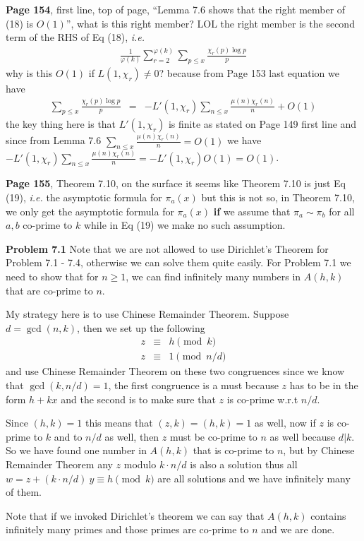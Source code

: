 \documentclass[aps,preprint,preprintnumbers,nofootinbib,showpacs,prd]{revtex4-1}
\newcommand{\ie}{{\it i.e.} }
\newcommand{\nbea}{\begin{eqnarray*}}
\newcommand{\neea}{\end{eqnarray*}}
\begin{document}
{\bf Page 154}, first line, top of page, ``Lemma 7.6 shows that the right member of (18) is $O(1)$'', what is this right member? LOL the right member is the second term of the RHS of Eq (18), \ie
%
\nbea
\frac{1}{\varphi(k)} \sum_{r=2}^{\varphi(k)}\sum_{p\le x}\frac{\chi_r(p)\log p}{p}
\neea
%
why is this $O(1)$ if $L(1,\chi_r)\neq0$? because from Page 153 last equation we have
%
\nbea
\sum_{p\le x}\frac{\chi_r(p)\log p}{p} & = & -L'(1,\chi_r)\sum_{n\le x}\frac{\mu(n)\chi_r(n)}{n} + O(1)
\neea
%
the key thing here is that $L'(1,\chi_r)$ is finite as stated on Page 149 first line and since from Lemma 7.6 $\sum_{n\le x}\frac{\mu(n)\chi_r(n)}{n} = O(1)$ we have $-L'(1,\chi_r)\sum_{n\le x}\frac{\mu(n)\chi_r(n)}{n} = -L'(1,\chi_r)O(1) = O(1)$.

{\bf Page 155}, Theorem 7.10, on the surface it seems like Theorem 7.10 is just Eq (19), \ie the asymptotic formula for $\pi_a(x)$ but this is not so, in Theorem 7.10, we only get the asymptotic formula for $\pi_a(x)$ {\bf if} we assume that $\pi_a \sim \pi_b$ for all $a,b$ co-prime to $k$ while in Eq (19) we make no such assumption.

{\bf Problem 7.1} Note that we are not allowed to use Dirichlet's Theorem for Problem 7.1 - 7.4, otherwise we can solve them quite easily. For Problem 7.1 we need to show that for $n \ge 1$, we can find infinitely many numbers in $A(h,k)$ that are co-prime to $n$.

My strategy here is to use Chinese Remainder Theorem. Suppose $d = \gcd(n,k)$, then we set up the following
%
\nbea
z & \equiv & h \pmod{k} \\
z & \equiv & 1 \pmod{n/d}
\neea
%
and use Chinese Remainder Theorem on these two congruences since we know that $\gcd(k,n/d) = 1$, the first congruence is a must because $z$ has to be in the form $h + kx$ and the second is to make sure that $z$ is co-prime w.r.t $n/d$.

Since $(h,k) = 1$ this means that $(z,k) = (h,k) = 1$ as well, now if $z$ is co-prime to $k$ and to $n/d$ as well, then $z$ must be co-prime to $n$ as well because $d | k$. So we have found one number in $A(h,k)$ that is co-prime to $n$, but by Chinese Remainder Theorem any $z$ modulo $k\cdot n/d$ is also a solution thus all $w = z + (k\cdot n/d)~y \equiv h \pmod{k}$ are all solutions and we have infinitely many of them.

Note that if we invoked Dirichlet's theorem we can say that $A(h,k)$ contains infinitely many primes and those primes are co-prime to $n$ and we are done.
\end{document}
